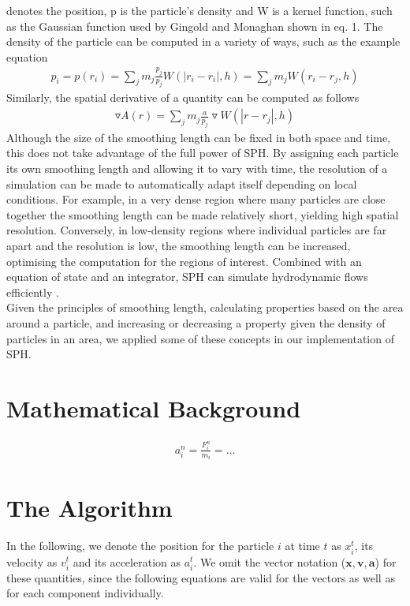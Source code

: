 \documentclass{sigchi}
\begin{document}
denotes the position, p is the particle's density and W is a kernel function, such as the 
Gaussian function used by Gingold and Monaghan shown in eq. 1. The density of 
the particle can be computed in a variety of ways, such as the example equation
\begin{align}
p_i = p(r_i) = \sum_{j} m_j \frac{p_j}{p_j} W (|r_i - r_i|,h) = \sum_{j} m_j W(r_i - r_j,h)
\end{align}
Similarly, the spatial derivative of a quantity can be computed as follows
\begin{align}
\triangledown A(r) = \sum_{j} m_j \frac{a}{p_j} \triangledown W(|r - r_j|, h)
\end{align}
Although the size of the smoothing length can be fixed in both space and time, this does 
not take advantage of the full power of SPH. By assigning each particle its own smoothing 
length and allowing it to vary with time, the resolution of a simulation can be made to 
automatically adapt itself depending on local conditions. For example, in a very dense 
region where many particles are close together the smoothing length can be made relatively 
short, yielding high spatial resolution. Conversely, in low-density regions where 
individual particles are far apart and the resolution is low, the smoothing length can be 
increased, optimising the computation for the regions of interest. Combined with an 
equation of state and an integrator, SPH can simulate hydrodynamic flows efficiently \cite{wikiarticle}.
\\
\hspace*{6 pt} Given the principles of smoothing length, calculating properties based on 
the area around a particle, and increasing or decreasing a property given the density of 
particles in an area, we applied some of these concepts in our implementation of SPH.
%

\section{Mathematical Background}
%
\begin{align}
	a_i^n = \frac{F_i^n}{m_i} = \dots
	\label{math:acceleration}
\end{align}

\section{The Algorithm}
%
In the following, we denote the position for the particle $i$ at time $t$ as $x_i^t$, its velocity as $v_i^t$ and its acceleration as $a_i^t$.
We omit the vector notation ($\boldsymbol{x},\boldsymbol{v},\boldsymbol{a}$) for these quantities, since the following equations are valid for the vectors as well as for each component individually.
\par\medskip
%
\end{document}
